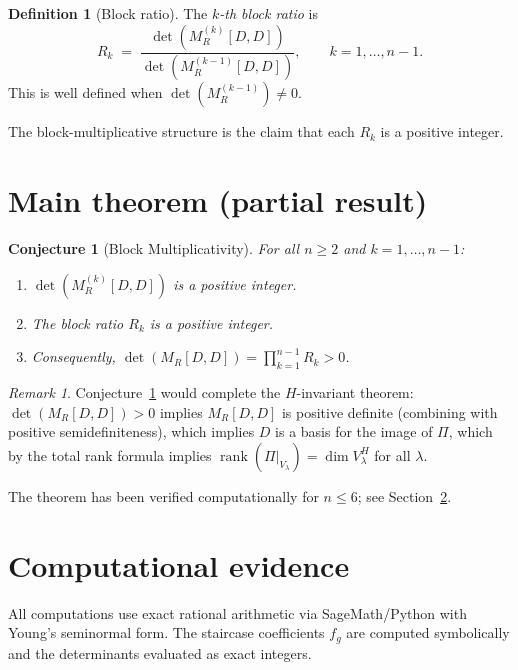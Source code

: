 \documentclass[11pt]{article}
\newtheorem{conjecture}[theorem]{Conjecture}
\theoremstyle{definition}
\newtheorem{definition}[theorem]{Definition}
\theoremstyle{remark}
\newtheorem{remark}[theorem]{Remark}
\newcommand{\rk}{\operatorname{rank}}
\begin{document}
\begin{definition}[Block ratio]
The \emph{$k$-th block ratio} is
\[
  R_k \;=\; \frac{\det(M_R^{(k)}[D,D])}{\det(M_R^{(k-1)}[D,D])},
  \qquad k = 1, \ldots, n-1.
\]
This is well defined when $\det(M_R^{(k-1)}) \ne 0$.
\end{definition}

The block-multiplicative structure is the claim that each $R_k$ is a
positive integer.

\section{Main theorem (partial result)}

\begin{conjecture}[Block Multiplicativity]\label{conj:block-mult}
For all $n \ge 2$ and $k = 1, \ldots, n-1$:
\begin{enumerate}
  \item $\det(M_R^{(k)}[D,D])$ is a positive integer.
  \item The block ratio $R_k$ is a positive integer.
  \item Consequently, $\det(M_R[D,D]) = \prod_{k=1}^{n-1} R_k > 0$.
\end{enumerate}
\end{conjecture}

\begin{remark}
Conjecture~\ref{conj:block-mult} would complete the $H$-invariant
theorem: $\det(M_R[D,D]) > 0$ implies $M_R[D,D]$ is positive definite
(combining with positive semidefiniteness), which implies $D$ is a
basis for the image of $\Pi$, which by the total rank formula implies
$\rk(\Pi|_{V_\lambda}) = \dim V_\lambda^H$ for all $\lambda$.
\end{remark}

The theorem has been verified computationally for $n \le 6$; see
Section~\ref{sec:evidence}.

\section{Computational evidence}\label{sec:evidence}

All computations use exact rational arithmetic via SageMath/Python with
Young's seminormal form.  The staircase coefficients $f_g$ are computed
symbolically and the determinants evaluated as exact integers.
\end{document}
